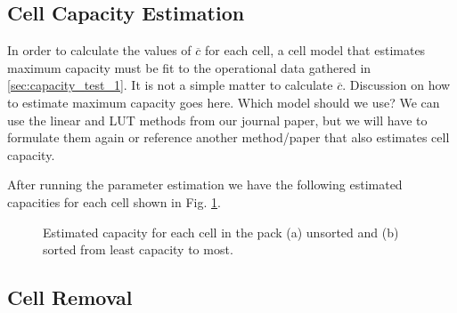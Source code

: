 \documentclass[10pt,twocolumn]{IEEEtran}
\begin{document}
\subsection{Cell Capacity Estimation}

In order to calculate the values of $\overline{c}$ for each cell, a cell model that estimates maximum capacity must be fit to the operational data gathered in \ref{sec:capacity_test_1}.
It is not a simple matter to calculate $\overline c$.
\color{red}
Discussion on how to estimate maximum capacity goes here. Which model should we use? We can use the linear and LUT methods from our journal paper, but we will have to formulate them again or reference another method/paper that also estimates cell capacity.
\color{black}

After running the parameter estimation we have the following estimated capacities for each cell shown in Fig. \ref{fig:cell_removal1}.
  
\begin{figure}[t]
\centering
\vspace{-0.2cm}
{} \vspace{-0.1cm}
\caption{Estimated capacity for each cell in the pack (a) unsorted and (b) sorted from least capacity to most.}
\vspace{-0.3cm}
\label{fig:cell_removal1}
\end{figure}

\subsection{Cell Removal}
\end{document}
